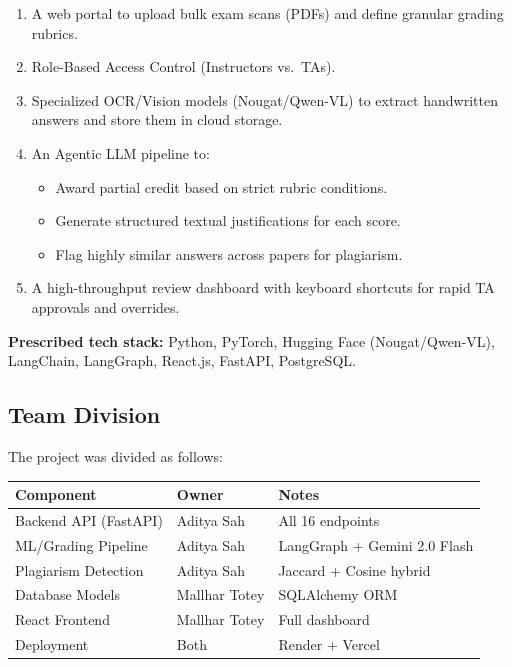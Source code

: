 \documentclass[12pt,a4paper]{article}
\begin{document}
\begin{infobox}
\begin{enumerate}[leftmargin=*, noitemsep]
  \item A web portal to upload bulk exam scans (PDFs) and define granular grading rubrics.
  \item Role-Based Access Control (Instructors vs.\ TAs).
  \item Specialized OCR/Vision models (Nougat/Qwen-VL) to extract handwritten answers and store them in cloud storage.
  \item An Agentic LLM pipeline to:
    \begin{itemize}[noitemsep]
      \item Award partial credit based on strict rubric conditions.
      \item Generate structured textual justifications for each score.
      \item Flag highly similar answers across papers for plagiarism.
    \end{itemize}
  \item A high-throughput review dashboard with keyboard shortcuts for rapid TA approvals and overrides.
\end{enumerate}
\end{infobox}

\textbf{Prescribed tech stack:} Python, PyTorch, Hugging Face (Nougat/Qwen-VL), LangChain, LangGraph, React.js, FastAPI, PostgreSQL.

\subsection{Team Division}

The project was divided as follows:

\begin{center}
\begin{tabular}{lll}
\toprule
\textbf{Component} & \textbf{Owner} & \textbf{Notes} \\
\midrule
Backend API (FastAPI) & Aditya Sah & All 16 endpoints \\
ML/Grading Pipeline & Aditya Sah & LangGraph + Gemini 2.0 Flash \\
Plagiarism Detection & Aditya Sah & Jaccard + Cosine hybrid \\
Database Models & Mallhar Totey & SQLAlchemy ORM \\
React Frontend & Mallhar Totey & Full dashboard \\
Deployment & Both & Render + Vercel \\
\bottomrule
\end{tabular}
\end{center}
\end{document}

